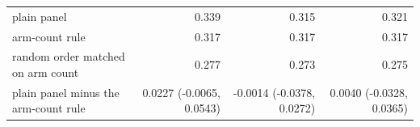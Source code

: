 \begin{tabular}{p{6.6cm}rrr}
plain panel & 0.339 & 0.315 & 0.321 \\
arm-count rule & 0.317 & 0.317 & 0.317 \\
random order matched on arm count & 0.277 & 0.273 & 0.275 \\
plain panel minus the arm-count rule & 0.0227 (-0.0065, 0.0543) & -0.0014 (-0.0378, 0.0272) & 0.0040 (-0.0328, 0.0365) \\

\end{tabular}
